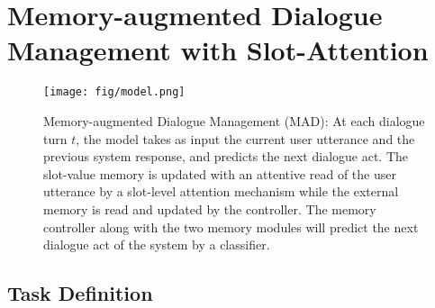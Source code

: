 
\section{Memory-augmented Dialogue Management with Slot-Attention}

\begin{figure}
  \texttt{[image: fig/model.png]}
  \caption{Memory-augmented Dialogue Management (MAD): At each dialogue turn $t$, the model takes as input the current user utterance and the previous system response, and predicts the next dialogue act. The slot-value memory is updated with an attentive read of the user utterance by a slot-level attention mechanism while the external memory is read and updated by the controller. The memory controller along with the two memory modules will predict the next dialogue act of the system by a classifier.
  }
  \label{fig:model}
\end{figure}


\subsection{Task Definition}
\label{sec:taskdef}

